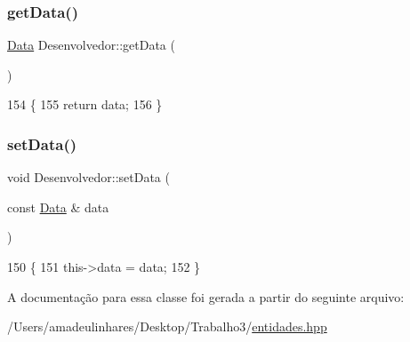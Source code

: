 \subsubsection{\texorpdfstring{get\+Data()}{getData()}}
{\footnotesize\ttfamily \mbox{\hyperlink{class_data}{Data}} Desenvolvedor\+::get\+Data (\begin{DoxyParamCaption}{ }\end{DoxyParamCaption})\hspace{0.3cm}{\ttfamily [inline]}}


\begin{DoxyCode}
154   \{
155     \textcolor{keywordflow}{return} data;
156   \}
\end{DoxyCode}
\mbox{\label{class_desenvolvedor_a17ca20f8623c4e3d21676fd7f4b96575}} 
\subsubsection{\texorpdfstring{set\+Data()}{setData()}}
{\footnotesize\ttfamily void Desenvolvedor\+::set\+Data (\begin{DoxyParamCaption}\item[{const \mbox{\hyperlink{class_data}{Data}} \&}]{data }\end{DoxyParamCaption})\hspace{0.3cm}{\ttfamily [inline]}}


\begin{DoxyCode}
150   \{
151     this->data = data;
152   \}
\end{DoxyCode}


A documentação para essa classe foi gerada a partir do seguinte arquivo\+:\begin{DoxyCompactItemize}
\item 
/\+Users/amadeulinhares/\+Desktop/\+Trabalho3/\mbox{\hyperlink{entidades_8hpp}{entidades.\+hpp}}\end{DoxyCompactItemize}
